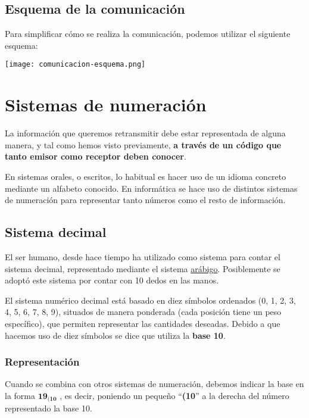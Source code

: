 \subsection{Esquema de la comunicación}
Para simplificar cómo se realiza la comunicación, podemos utilizar el siguiente esquema:

\begin{center}
    \vspace{-10pt}
    \texttt{[image: comunicacion-esquema.png]}
    \vspace{-10pt}
\end{center}


\section{Sistemas de numeración}
La información que queremos retransmitir debe estar representada de alguna manera, y tal como hemos visto previamente, \textbf{a través de un código que tanto emisor como receptor deben conocer}.

En sistemas orales, o escritos, lo habitual es hacer uso de un idioma concreto mediante un alfabeto conocido. En informática se hace uso de distintos sistemas de numeración para representar tanto números como el resto de información.

\subsection{Sistema decimal}
El ser humano, desde hace tiempo ha utilizado como sistema para contar el sistema decimal, representado mediante el sistema \href{https://es.wikipedia.org/wiki/N%C3%BAmeros_ar%C3%A1bigos}{arábigo}. Posiblemente se adoptó este sistema por contar con 10 dedos en las manos.

El sistema numérico decimal está basado en diez símbolos ordenados (0, 1, 2, 3, 4, 5, 6, 7, 8, 9), situados de manera ponderada (cada posición tiene un peso específico), que permiten representar las cantidades deseadas. Debido a que hacemos uso de diez símbolos se dice que utiliza la \textbf{base 10}.

\subsubsection*{Representación}
Cuando se combina con otros sistemas de numeración, debemos indicar la base en la forma $ \mathbf{19_{(10}} $ , es decir, poniendo un pequeño “\textbf{(10}” a la derecha del número representado la base 10.


